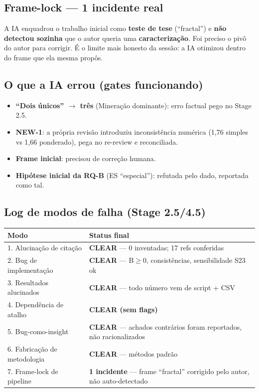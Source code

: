 \documentclass[12pt,a4paper]{article}
\begin{document}
\subsection*{Frame-lock — 1 incidente real}
A IA enquadrou o trabalho inicial como \textbf{teste de tese} (``fractal'') e \textbf{não detectou
sozinha} que o autor queria uma \textbf{caracterização}. Foi preciso o pivô do autor para corrigir. É o
limite mais honesto da sessão: a IA otimizou dentro do frame que ela mesma propôs.

\subsection*{O que a IA errou (gates funcionando)}
\begin{itemize}\setlength\itemsep{1pt}
\item \textbf{``Dois únicos'' $\to$ três} (Mineração dominante): erro factual pego no Stage 2.5.
\item \textbf{NEW-1}: a própria revisão introduziu inconsistência numérica (1,76 simples vs 1,66
  ponderado), pega no re-review e reconciliada.
\item \textbf{Frame inicial}: precisou de correção humana.
\item \textbf{Hipótese inicial da RQ-B} (ES ``especial''): refutada pelo dado, reportada como tal.
\end{itemize}

\subsection*{Log de modos de falha (Stage 2.5/4.5)}
\begin{longtable}{p{6.2cm}p{8cm}}
\toprule
\textbf{Modo} & \textbf{Status final} \\
\midrule
1. Alucinação de citação & \textbf{CLEAR} — 0 inventadas; 17 refs conferidas \\
2. Bug de implementação & \textbf{CLEAR} — B$\geq$0, consistências, sensibilidade S23 ok \\
3. Resultados alucinados & \textbf{CLEAR} — todo número vem de script + CSV \\
4. Dependência de atalho & \textbf{CLEAR (sem flags)} \\
5. Bug-como-insight & \textbf{CLEAR} — achados contrários foram reportados, não racionalizados \\
6. Fabricação de metodologia & \textbf{CLEAR} — métodos padrão \\
7. Frame-lock de pipeline & \textbf{1 incidente} — frame ``fractal'' corrigido pelo autor, não auto-detectado \\
\bottomrule
\end{longtable}
\end{document}
